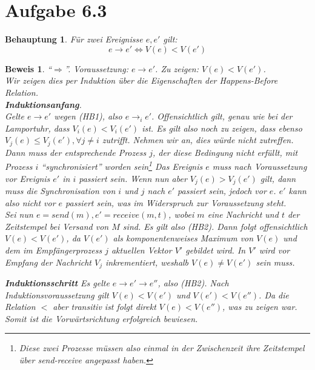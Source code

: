 \documentclass[a4paper,
12pt,
BCOR12mm,
]{scrartcl}
\theoremstyle{break}
\newtheorem{beh}{Behauptung}
\newtheorem{bew}{Beweis}
\begin{document}
\section*{Aufgabe 6.3}
\begin{beh}
  Für zwei Ereignisse $e,e'$ gilt: \[e \rightarrow e' \Longleftrightarrow V(e) < V(e')\]
\end{beh}
\begin{bew}
  "`$\Longrightarrow$"'. Voraussetzung: $e \rightarrow e'$. Zu zeigen: $V(e) < V(e')$. \\
  Wir zeigen dies per Induktion über die Eigenschaften der \emph{Happens-Before
  Relation}. \\
\textbf{Induktionsanfang}. \\

Gelte $e \rightarrow e'$ wegen (HB1), also $e \rightarrow_i e'$. Offensichtlich gilt,
genau wie bei der Lamportuhr, dass $V_i(e) < V_i(e')$ ist. Es gilt also noch zu zeigen,
dass ebenso $V_j(e) \leq V_j(e'), \forall j \neq i$ zutrifft. Nehmen wir an, dies würde
nicht zutreffen. Dann muss der entsprechende Prozess $j$, der diese Bedingung nicht
erfüllt, mit Prozess $i$ "`synchronisiert"' worden sein\footnote{Diese zwei Prozesse
müssen also einmal in der Zwischenzeit ihre Zeitstempel über \emph{send-receive} angepasst
haben.} Das Ereignis $e$ muss nach Voraussetzung vor Ereignis $e'$ in $i$ passiert sein.
Wenn nun aber $V_j(e) > V_j(e')$ gilt, dann muss die Synchronisation von $i$ und $j$
nach $e'$ passiert sein, jedoch vor $e$. $e'$ kann also nicht vor $e$ passiert sein, was
im Widerspruch zur Voraussetzung steht.\\

Sei nun $e = send(m), e' = receive(m,t)$, wobei $m$ eine Nachricht und $t$ der Zeitstempel
bei Versand von $M$ sind. Es gilt also (HB2). Dann folgt offensichtlich $V(e) < V(e')$, da $V(e')$ als
komponentenweises Maximum von $V(e)$ und dem im Empfängerprozess $j$ aktuellen Vektor $V'$
gebildet wird. In $V'$ wird vor Empfang der Nachricht $V_j$ inkrementiert, weshalb $V(e)
\neq V(e')$ sein muss.

\textbf{Induktionsschritt}
Es gelte $e \rightarrow e' \rightarrow e''$, also (HB2). Nach Induktionsvoraussetzung
gilt $V(e) < V(e')$ und $V(e') < V(e'')$. Da die Relation $<$ aber transitiv ist folgt
direkt $V(e) < V(e'')$, was zu zeigen war. \\
Somit ist die Vorwärtsrichtung erfolgreich bewiesen.

\end{bew}
\end{document}
